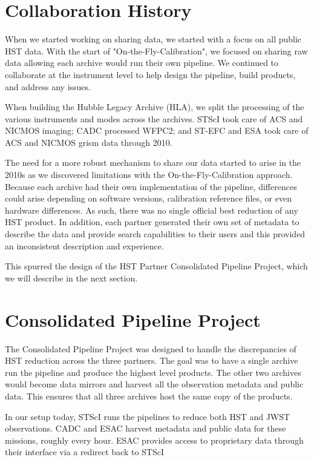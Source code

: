 \documentclass[11pt,twoside]{article}
\begin{document}
\section{Collaboration History}

When we started working on sharing data, we started with a focus on all public HST data. 
With the start of "On-the-Fly-Calibration", we focused on sharing raw data allowing each archive would run their own pipeline. 
We continued to collaborate at the instrument level to help design the pipeline, build products, and address any issues.

When building the Hubble Legacy Archive (HLA), we split the processing of the various instruments and modes across the archives. 
STScI took care of ACS and NICMOS imaging; CADC processed WFPC2; and ST-EFC and ESA took care of ACS and NICMOS grism data through 2010. 

The need for a more robust mechanism to share our data started to arise in the 2010s as we discovered limitations with the On-the-Fly-Calibration approach. 
Because each archive had their own implementation of the pipeline, differences could arise depending on software versions, calibration reference files, or even hardware differences. 
As such, there was no single official best reduction of any HST product. 
In addition, each partner generated their own set of metadata to describe the data and provide search capabilities to their users and this provided an inconsistent description and experience.

This spurred the design of the HST Partner Consolidated Pipeline Project, which we will describe in the next section.

\section{Consolidated Pipeline Project}

The Consolidated Pipeline Project was designed to handle the discrepancies of HST reduction across the three partners. 
The goal was to have a single archive run the pipeline and produce the highest level products. 
The other two archives would become data mirrors and harvest all the observation metadata and public data. 
This ensures that all three archives host the same copy of the products. 

In our setup today, STScI runs the pipelines to reduce both HST and JWST observations. 
CADC and ESAC harvest metadata and public data for these missions, roughly every hour. 
ESAC provides access to proprietary data through their interface via a redirect back to STScI
\end{document}
